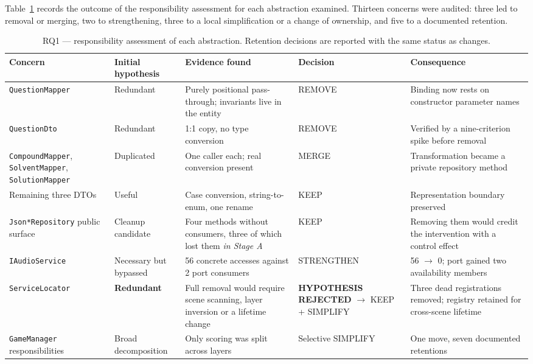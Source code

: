 \documentclass{sbc2019}%
\begin{document}
Table~\ref{tab:rq1} records the outcome of the responsibility assessment for
each abstraction examined. Thirteen concerns were audited: three led to removal or
merging, two to strengthening, three to a local simplification or a change
of ownership, and five to a documented retention.

\begin{table}[!tp]
\centering
\caption{RQ1 --- responsibility assessment of each abstraction. Retention
decisions are reported with the same status as changes.}\label{tab:rq1}
\small
\begin{tabular}{p{}p{}p{}p{}p{}}
\toprule
\textbf{Concern} & \textbf{Initial hypothesis} & \textbf{Evidence found} & \textbf{Decision} & \textbf{Consequence} \\
\midrule
\texttt{QuestionMapper} & Redundant & Purely positional pass-through; invariants live in the entity & REMOVE & Binding now rests on constructor parameter names \\
\addlinespace
\texttt{QuestionDto} & Redundant & 1:1 copy, no type conversion & REMOVE & Verified by a nine-criterion spike before removal \\
\addlinespace
\texttt{CompoundMapper}, \texttt{SolventMapper}, \texttt{SolutionMapper} & Duplicated & One caller each; real conversion present & MERGE & Transformation became a private repository method \\
\addlinespace
Remaining three DTOs & Useful & Case conversion, string-to-enum, one rename & KEEP & Representation boundary preserved \\
\addlinespace
\texttt{Json*Repository} public surface & Cleanup candidate & Four methods without consumers, three of which lost them \emph{in Stage A} & KEEP & Removing them would credit the intervention with a control effect \\
\addlinespace
\texttt{IAudioService} & Necessary but bypassed & 56 concrete accesses against 2 port consumers & STRENGTHEN & 56 $\rightarrow$ 0; port gained two availability members \\
\addlinespace
\texttt{ServiceLocator} & \textbf{Redundant} & Full removal would require scene scanning, layer inversion or a lifetime change & \textbf{HYPOTHESIS REJECTED} $\rightarrow$ KEEP + SIMPLIFY & Three dead registrations removed; registry retained for cross-scene lifetime \\
\addlinespace
\texttt{GameManager} responsibilities & Broad decomposition & Only scoring was split across layers & Selective SIMPLIFY & One move, seven documented retentions \\

\end{tabular}
\end{table}
\end{document}
